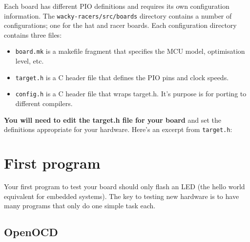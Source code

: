 Each board has different PIO definitions and requires its own
configuration information. The \texttt{wacky-racers/src/boards}
directory contains a number of configurations; one for the hat and racer
boards. Each configuration directory contains three files:

\begin{itemize}
\item
  \texttt{board.mk} is a makefile fragment that specifies the MCU model,
  optimisation level, etc.
\item
  \texttt{target.h} is a C header file that defines the PIO pins and
  clock speeds.
\item
  \texttt{config.h} is a C header file that wraps target.h. It's purpose
  is for porting to different compilers.
\end{itemize}

\textbf{You will need to edit the target.h file for your board} and set
the definitions appropriate for your hardware. Here's an excerpt from
\texttt{target.h}:

\begin{Shaded}
\begin{Highlighting}[]



\end{Highlighting}
\end{Shaded}

\section{First program}
\label{first-program}

Your first program to test your board should only flash an LED (the
hello world equivalent for embedded systems). The key to testing new
hardware is to have many programs that only do one simple task each.

\subsection{OpenOCD}
\label{openocd}


